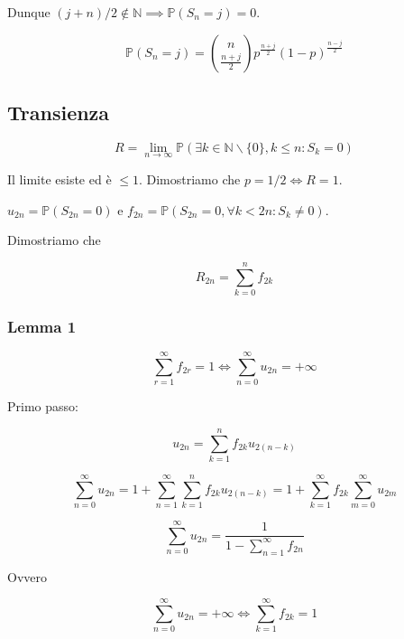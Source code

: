 \documentclass[12pt,a4paper]{article}
\numberwithin{equation}{section}
\theoremstyle{definition}
\theoremstyle{remark}
\begin{document}
Dunque $(j+n)/2 \notin \mathbb{N} \implies \mathbb{P}(S_n = j) = 0$.

\begin{equation}
\mathbb{P} (S_n = j) = {n \choose \frac{n+j}{2} } p^{\frac{n+j}{2}} (1-p) ^{\frac{n-j}{2}}
\end{equation}

\subsection{Transienza}

\begin{equation}
R = \lim_{n \rightarrow \infty} \mathbb{P} (\exists k \in \mathbb{N} \smallsetminus \lbrace 0 \rbrace, k \leq n : S_k = 0 )
\end{equation}

Il limite esiste ed è $\leq 1$. Dimostriamo che $p = 1/2 \iff R=1$.

$u_{2n} = \mathbb{P} (S_{2n} = 0)$ e $f_{2n} = \mathbb{P}(S_{2n} = 0, \forall k < 2n : S_k \neq 0 )$.

Dimostriamo che

\begin{equation}
R_{2n} = \sum_{k=0}^{n} f_{2k}
\end{equation}

\subsubsection{Lemma 1}

\begin{equation}
\sum_{r=1}^\infty f_{2r} = 1 \iff \sum_{n=0}^\infty u_{2n} = + \infty
\end{equation}

Primo passo:

\begin{equation}
u_{2n} = \sum_{k=1}^n f_{2k} u_{2(n-k)}
\end{equation}

\begin{equation}
\sum_{n=0}^\infty u_{2n} = 1 + \sum_{n=1}^\infty \sum_{k=1}^n f_{2k} u_{2(n-k)} = 1 + \sum_{k=1}^\infty f_{2k} \sum_{m=0}^\infty u_{2m}
\end{equation}

\begin{equation}
\sum_{n=0}^\infty u_{2n} = \frac{1}{1-\sum_{n=1}^\infty f_{2n}}
\end{equation}

Ovvero

\begin{equation}
\sum_{n=0}^\infty u_{2n} = + \infty \iff \sum_{k=1}^\infty f_{2k} = 1
\end{equation}
\end{document}
